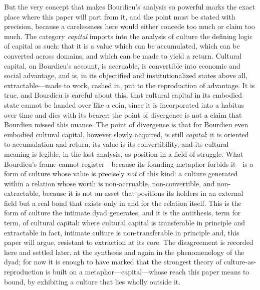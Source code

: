 But the very concept that makes Bourdieu's analysis so powerful marks the exact place where this paper will part from it, and the point must be stated with precision, because a carelessness here would either concede too much or claim too much. The category \emph{capital} imports into the analysis of culture the defining logic of capital as such: that it is a value which can be accumulated, which can be converted across domains, and which can be made to yield a return. Cultural capital, on Bourdieu's account, is accruable, is convertible into economic and social advantage, and is, in its objectified and institutionalized states above all, extractable---made to work, cashed in, put to the reproduction of advantage. It is true, and Bourdieu is careful about this, that cultural capital in its embodied state cannot be handed over like a coin, since it is incorporated into a habitus over time and dies with its bearer; the point of divergence is not a claim that Bourdieu missed this nuance. The point of divergence is that for Bourdieu even embodied cultural capital, however slowly acquired, is still \emph{capital}: it is oriented to accumulation and return, its value is its convertibility, and its cultural meaning is legible, in the last analysis, as position in a field of struggle. What Bourdieu's frame cannot register---because its founding metaphor forbids it---is a form of culture whose value is precisely \emph{not} of this kind: a culture generated within a relation whose worth is non-accruable, non-convertible, and non-extractable, because it is not an asset that positions its holders in an external field but a real bond that exists only in and for the relation itself. This is the form of culture the intimate dyad generates, and it is the antithesis, term for term, of cultural capital: where cultural capital is transferable in principle and extractable in fact, intimate culture is non-transferable in principle and, this paper will argue, resistant to extraction at its core. The disagreement is recorded here and settled later, at the synthesis and again in the phenomenology of the dyad; for now it is enough to have marked that the strongest theory of culture-as-reproduction is built on a metaphor---capital---whose reach this paper means to bound, by exhibiting a culture that lies wholly outside it.
